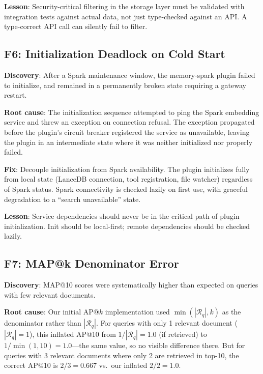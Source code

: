 \documentclass[11pt]{article}
\begin{document}
\textbf{Lesson}: Security-critical filtering in the storage layer must be validated
with integration tests against actual data, not just type-checked against an API. A
type-correct API call can silently fail to filter.

\subsection{F6: Initialization Deadlock on Cold Start}
\label{sec:failures:F6}

\textbf{Discovery}: After a Spark maintenance window, the memory-spark plugin failed
to initialize, and remained in a permanently broken state requiring a gateway restart.

\textbf{Root cause}: The initialization sequence attempted to ping the Spark embedding
service and threw an exception on connection refusal. The exception propagated before
the plugin's circuit breaker registered the service as unavailable, leaving the plugin
in an intermediate state where it was neither initialized nor properly failed.

\textbf{Fix}: Decouple initialization from Spark availability. The plugin initializes
fully from local state (LanceDB connection, tool registration, file watcher) regardless
of Spark status. Spark connectivity is checked lazily on first use, with graceful
degradation to a ``search unavailable'' state.

\textbf{Lesson}: Service dependencies should never be in the critical path of plugin
initialization. Init should be local-first; remote dependencies should be checked
lazily.

\subsection{F7: MAP@k Denominator Error}
\label{sec:failures:F7}

\textbf{Discovery}: MAP@10 scores were systematically higher than expected on queries
with few relevant documents.

\textbf{Root cause}: Our initial AP@$k$ implementation used $\min(|\mathcal{R}_q|, k)$
as the denominator rather than $|\mathcal{R}_q|$. For queries with only 1 relevant
document ($|\mathcal{R}_q|=1$), this inflated AP@10 from $1/|\mathcal{R}_q|=1.0$ (if
retrieved) to $1/\min(1,10)=1.0$---the same value, so no visible difference there. But
for queries with 3 relevant documents where only 2 are retrieved in top-10, the correct
AP@10 is $2/3 = 0.667$ vs.\ our inflated $2/2 = 1.0$.
\end{document}

